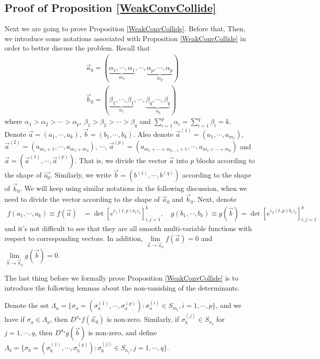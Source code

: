 \subsection{Proof of Proposition \ref{WeakConvCollide}}{\label{ProofProp2}}
Next we are going to prove Proposition \ref{WeakConvCollide}. Before that, 
Then, we introduce some notations associated with Proposition \ref{WeakConvCollide} in order to better discuss the problem. Recall that
\begin{align*}
	&\vec{a}_{0}=(\underbrace{\alpha_{1},\cdots,\alpha_{1}}_{m_{1}},\cdots,\underbrace{\alpha_{p},\cdots,\alpha_{p}}_{m_{p}})\\
	&\vec{b}_{0}=(\underbrace{\beta_{1},\cdots,\beta_{1}}_{n_{1}},\cdots,\underbrace{\beta_{q},\cdots,\beta_{q}}_{n_{q}})
\end{align*}
where $\alpha_{1}>\alpha_{2}>\cdots>\alpha_{p}$, $\beta_{1}>\beta_{2}>\cdots>\beta_{q}$ and $\sum_{i=1}^{p}\alpha_{i}=\sum_{i=1}^{q}\beta_{i}=k$. Denote $\vec{a}=(a_{1},\cdots,a_{k})$, $\vec{b}=(b_{1},\cdots,b_{k})$. Also denote $\vec{a}^{(1)}=(a_{1},\cdots,a_{m_1})$, $\vec{a}^{(2)}=(a_{m_{1}+1},\cdots,a_{m_1+m_2})$, $\cdots$, $\vec{a}^{(p)}=(a_{m_1+\cdots+m_{p-1}+1},\cdots, a_{m_1+\cdots+m_{p}})$ and $\vec{a}=(\vec{a}^{(1)},\cdots,\vec{a}^{(p)})$. That is, we divide the vector $\vec{a}$ into $p$ blocks according to the shape of $\vec{a_{0}}$. Similarly, we write $\vec{b}=(b^{(1)},\cdots,b^{(q)})$ according to the shape of $\vec{b}_{0}$. We will keep using similar notations in the following discussion, when we need to divide the vector according to the shape of $\vec{a}_{0}$ and $\vec{b}_{0}$. Next, denote
\begin{align*}
	f(a_{1},\cdots,a_{k})\equiv f(\vec{a})&=\det[e^{c_1(t,p)a_{i}z_{j}}]_{i,j=1}^{k},\quad g(b_{1},\cdots,b_{k})\equiv g(\vec{b})=\det[e^{c_2(t,p)b_{i}z_{j}}]_{i,j=1}^{k}
\end{align*} 
and it's not difficult to see that they are all smooth multi-variable functions with respect to corresponding vectors. In addition, $\lim\limits_{\vec{a}\rightarrow\vec{a}_{0}}f(\vec{a})=0$ and $\lim\limits_{\vec{b}\rightarrow\vec{b}_{0}}g(\vec{b})=0$. 

The last thing before we formally prove Proposition \ref{WeakConvCollide} is to introduce the following lemmas about the non-vanishing of the determinants.

\begin{remark}{\label{DefLambda}}
Denote the set $\Lambda_{a}=\{\sigma_{a}=(\sigma_{a}^{(1)},\cdots,\sigma_{a}^{(p)}):\sigma_{a}^{(i)}\in S_{m_{i}}, i=1,\cdots,p\}$, and we have if $\sigma_{a}\in \Lambda_{a}$, then $D^{\sigma_{a}}f(\vec{a}_{0})$ is non-zero. Similarly, if $\sigma^{(j)}_{b}\in S_{n_j}$ for $j=1,\cdots,q$, then $D^{\sigma_{b}}g(\vec{b})$ is non-zero, and define $\Lambda_{b}=\{\sigma_{b}=(\sigma_{b}^{(1)},\cdots,\sigma_{b}^{(q)}):\sigma_{b}^{(j)}\in S_{n_{j}}, j=1,\cdots,q\}$.
\end{remark}


